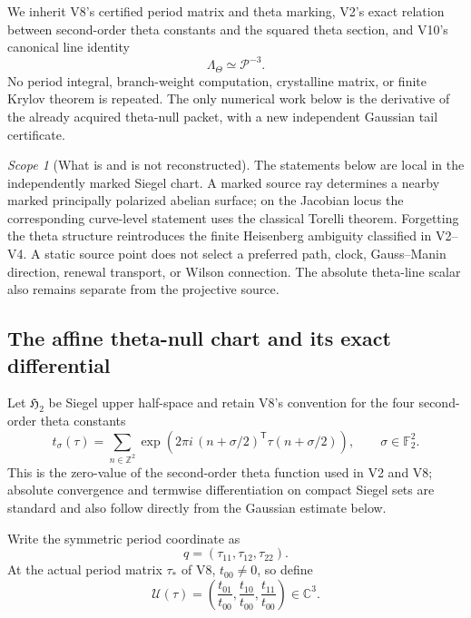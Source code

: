 \documentclass[11pt]{article}
\theoremstyle{definition}
\theoremstyle{remark}
\newtheorem{scope}[scope]{Scope}
\begin{document}
We inherit V8's certified period matrix and theta marking, V2's exact relation
between second-order theta constants and the squared theta section, and V10's
canonical line identity
\[
 \Lambda_\Theta\simeq\mathscr P^{-3}.
\]
No period integral, branch-weight computation, crystalline matrix, or finite
Krylov theorem is repeated.  The only numerical work below is the derivative
of the already acquired theta-null packet, with a new independent Gaussian
tail certificate.

\begin{scope}[What is and is not reconstructed]
The statements below are local in the independently marked Siegel chart.  A
marked source ray determines a nearby marked principally polarized abelian
surface; on the Jacobian locus the corresponding curve-level statement uses
the classical Torelli theorem.  Forgetting the theta structure reintroduces
the finite Heisenberg ambiguity classified in V2--V4.  A static source point
does not select a preferred path, clock, Gauss--Manin direction, renewal
transport, or Wilson connection.  The absolute theta-line scalar also remains
separate from the projective source.
\end{scope}

\subsection{The affine theta-null chart and its exact differential}
Let \(\mathfrak H_2\) be Siegel upper half-space and retain V8's convention
for the four second-order theta constants
\begin{equation}
 t_\sigma(\tau)
 =\sum_{n\in\mathbb Z^2}
 \exp\!\left(
 2\pi i\,(n+\sigma/2)^{\mathsf T}\tau(n+\sigma/2)
 \right),
 \qquad \sigma\in\mathbb F_2^2.
 \label{eq:v12-theta-null}
\end{equation}
This is the zero-value of the second-order theta function used in V2 and V8;
absolute convergence and termwise differentiation on compact Siegel sets are
standard \cite{DLMFTheta} and also follow directly from the Gaussian estimate
below.

Write the symmetric period coordinate as
\[
 q=(\tau_{11},\tau_{12},\tau_{22}).
\]
At the actual period matrix \(\tau_*\) of V8, \(t_{00}\ne0\), so define
\begin{equation}
 \boxed{
 \mathcal U(\tau)
 =\left(
 \frac{t_{01}}{t_{00}},
 \frac{t_{10}}{t_{00}},
 \frac{t_{11}}{t_{00}}
 \right)\in\mathbb C^3.}
 \label{eq:v12-affine-map}
\end{equation}
\end{document}
